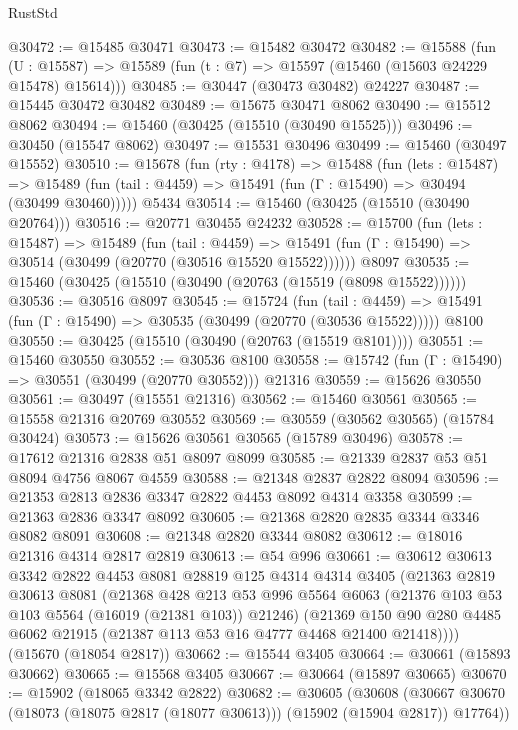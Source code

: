 \begin{lexlean}{RustStd}
\begin{coremodule}
@30472 := @15485 @30471
@30473 := @15482 @30472
@30482 := @15588
    (fun (U : @15587) => @15589 (fun (t : @7) => @15597 (@15460 (@15603 @24229 @15478) @15614)))
@30485 := @30447 (@30473 @30482) @24227
@30487 := @15445 @30472 @30482
@30489 := @15675 @30471 @8062
@30490 := @15512 @8062
@30494 := @15460 (@30425 (@15510 (@30490 @15525)))
@30496 := @30450 (@15547 @8062)
@30497 := @15531 @30496
@30499 := @15460 (@30497 @15552)
@30510 := @15678
    (fun (rty : @4178) =>
    @15488
      (fun (lets : @15487) =>
      @15489 (fun (tail : @4459) => @15491 (fun (Γ : @15490) => @30494 (@30499 @30460)))))
    @5434
@30514 := @15460 (@30425 (@15510 (@30490 @20764)))
@30516 := @20771 @30455 @24232
@30528 := @15700
    (fun (lets : @15487) =>
    @15489
      (fun (tail : @4459) =>
      @15491 (fun (Γ : @15490) => @30514 (@30499 (@20770 (@30516 @15520 @15522))))))
    @8097
@30535 := @15460 (@30425 (@15510 (@30490 (@20763 (@15519 (@8098 @15522))))))
@30536 := @30516 @8097
@30545 := @15724
    (fun (tail : @4459) => @15491 (fun (Γ : @15490) => @30535 (@30499 (@20770 (@30536 @15522)))))
    @8100
@30550 := @30425 (@15510 (@30490 (@20763 (@15519 @8101))))
@30551 := @15460 @30550
@30552 := @30536 @8100
@30558 := @15742 (fun (Γ : @15490) => @30551 (@30499 (@20770 @30552))) @21316
@30559 := @15626 @30550
@30561 := @30497 (@15551 @21316)
@30562 := @15460 @30561
@30565 := @15558 @21316 @20769 @30552
@30569 := @30559 (@30562 @30565) (@15784 @30424)
@30573 := @15626 @30561 @30565 (@15789 @30496)
@30578 := @17612 @21316 @2838 @51 @8097 @8099
@30585 := @21339 @2837 @53 @51 @8094 @4756 @8067 @4559
@30588 := @21348 @2837 @2822 @8094
@30596 := @21353 @2813 @2836 @3347 @2822 @4453 @8092 @4314 @3358
@30599 := @21363 @2836 @3347 @8092
@30605 := @21368 @2820 @2835 @3344 @3346 @8082 @8091
@30608 := @21348 @2820 @3344 @8082
@30612 := @18016 @21316 @4314 @2817 @2819
@30613 := @54 @996
@30661 := @30612
    @30613
    @3342
    @2822
    @4453
    @8081
    @28819
    @125
    @4314
    @4314
    @3405
    (@21363
      @2819
      @30613
      @8081
      (@21368
        @428
        @213
        @53
        @996
        @5564
        @6063
        (@21376 @103 @53 @103 @5564 (@16019 (@21381 @103)) @21246)
        (@21369 @150 @90 @280 @4485 @6062 @21915 (@21387 @113 @53 @16 @4777 @4468 @21400 @21418))))
    (@15670 (@18054 @2817))
@30662 := @15544 @3405
@30664 := @30661 (@15893 @30662)
@30665 := @15568 @3405
@30667 := @30664 (@15897 @30665)
@30670 := @15902 (@18065 @3342 @2822)
@30682 := @30605
    (@30608 (@30667 @30670 (@18073 (@18075 @2817 (@18077 @30613))) (@15902 (@15904 @2817)) @17764))

\end{coremodule}
\end{lexlean}
